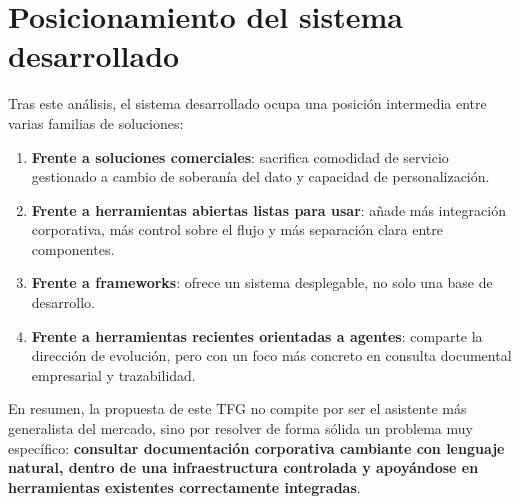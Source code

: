 \section{Posicionamiento del sistema desarrollado}
\label{sec:posicionamiento}

Tras este análisis, el sistema desarrollado ocupa una posición intermedia entre varias familias de soluciones:

\begin{enumerate}
    \item \textbf{Frente a soluciones comerciales}: sacrifica comodidad de servicio gestionado a cambio de soberanía del dato y capacidad de personalización.
    \item \textbf{Frente a herramientas abiertas listas para usar}: añade más integración corporativa, más control sobre el flujo y más separación clara entre componentes.
    \item \textbf{Frente a frameworks}: ofrece un sistema desplegable, no solo una base de desarrollo.
    \item \textbf{Frente a herramientas recientes orientadas a agentes}: comparte la dirección de evolución, pero con un foco más concreto en consulta documental empresarial y trazabilidad.
\end{enumerate}

En resumen, la propuesta de este TFG no compite por ser el asistente más generalista del mercado, sino por resolver de forma sólida un problema muy específico: \textbf{consultar documentación corporativa cambiante con lenguaje natural, dentro de una infraestructura controlada y apoyándose en herramientas existentes correctamente integradas}.
